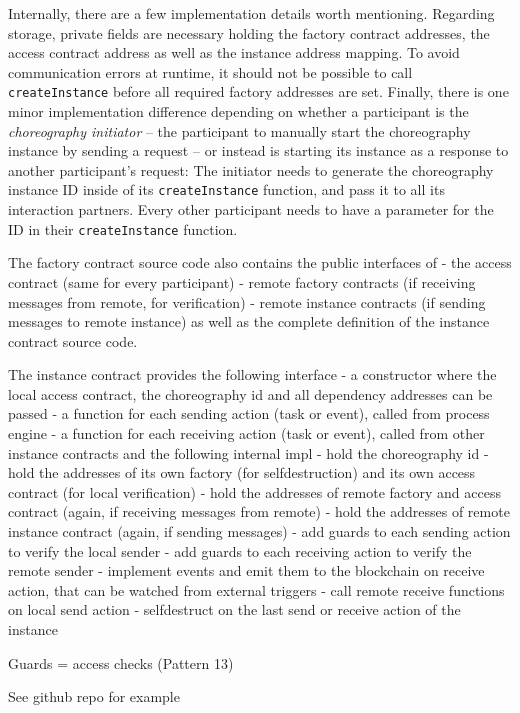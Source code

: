 \documentclass[runningheads]{llncs}
\begin{document}
Internally, there are a few implementation details worth mentioning.
Regarding storage, private fields are necessary holding the factory contract addresses, the access contract address as well as the instance address mapping.
To avoid communication errors at runtime, it should not be possible to call \texttt{createInstance} before all required factory addresses are set.
Finally, there is one minor implementation difference depending on whether a participant is the \textit{choreography initiator} -- the participant to manually start the choreography instance by sending a request -- or instead is starting its instance as a response to another participant's request: %
The initiator needs to generate the choreography instance ID inside of its \texttt{createInstance} function, and pass it to all its interaction partners.
Every other participant needs to have a parameter for the ID in their \texttt{createInstance} function.


The factory contract source code also contains the public interfaces of
- the access contract (same for every participant)
- remote factory contracts (if receiving messages from remote, for verification)
- remote instance contracts (if sending messages to remote instance)
as well as the complete definition of the instance contract source code.

The instance contract provides the following interface
- a constructor where the local access contract, the choreography id and all dependency addresses can be passed
- a function for each sending action (task or event), called from process engine
- a function for each receiving action (task or event), called from other instance contracts
and the following internal impl
- hold the choreography id
- hold the addresses of its own factory (for selfdestruction) and its own access contract (for local verification)
- hold the addresses of remote factory and access contract (again, if receiving messages from remote)
- hold the addresses of remote instance contract (again, if sending messages)
- add guards to each sending action to verify the local sender
- add guards to each receiving action to verify the remote sender
- implement events and emit them to the blockchain on receive action, that can be watched from external triggers
- call remote receive functions on local send action
- selfdestruct on the last send or receive action of the instance

Guards = access checks (Pattern 13)

See github repo for example %
\end{document}
